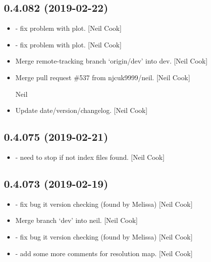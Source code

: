 \documentclass[a4paper,10pt,english]{report}
\begin{document}
\subsection{0.4.082 (2019-02-22)}
\label{\detokenize{misc/changelog:id180}}\begin{itemize}
\item {} 
 - fix problem with  plot. {[}Neil
Cook{]}

\item {} 
 - fix problem with 
plot. {[}Neil Cook{]}

\item {} 
Merge remote-tracking branch ‘origin/dev’ into dev. {[}Neil Cook{]}

\item {} 
Merge pull request \#537 from njcuk9999/neil. {[}Neil Cook{]}

Neil

\item {} 
Update date/version/changelog. {[}Neil Cook{]}

\end{itemize}


\subsection{0.4.075 (2019-02-21)}
\label{\detokenize{misc/changelog:id181}}\begin{itemize}
\item {} 
 - need to stop if not index files found. {[}Neil Cook{]}

\end{itemize}


\subsection{0.4.073 (2019-02-19)}
\label{\detokenize{misc/changelog:id182}}\begin{itemize}
\item {} 
 - fix bug it version checking (found by
Melissa) {[}Neil Cook{]}

\item {} 
Merge branch ‘dev’ into neil. {[}Neil Cook{]}

\item {} 
 - fix bug it version checking (found by
Melissa) {[}Neil Cook{]}

\item {} 
 - add some more comments for resolution map. {[}Neil Cook{]}

\end{itemize}
\end{document}
